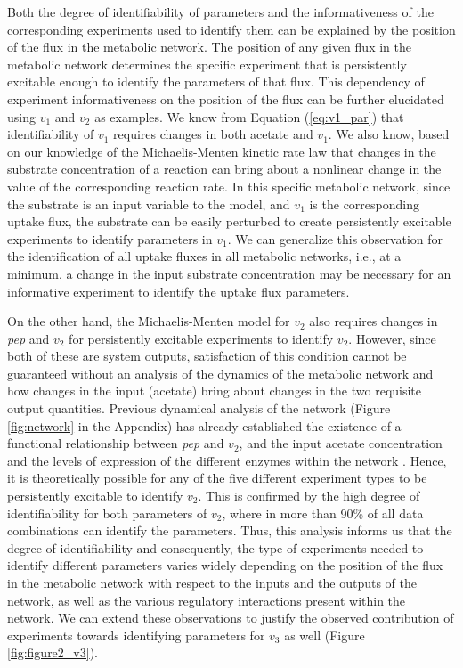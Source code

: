 \documentclass[10pt]{article}
\begin{document}
	Both the degree of identifiability of parameters and the informativeness of the corresponding experiments used to identify them can be explained by the position of the flux in the metabolic network. The position of any given flux in the metabolic network determines the specific experiment that is persistently excitable enough to identify the parameters of that flux. This dependency of experiment informativeness on the position of the flux can be further elucidated using $v_1$ and $v_2$ as examples. We know from Equation (\ref{eq:v1_par}) that identifiability of $v_1$ requires changes in both acetate and $v_1$. We also know, based on our knowledge of the Michaelis-Menten kinetic rate law that changes in the substrate concentration of a reaction can bring about a nonlinear change in the value of the corresponding reaction rate. In this specific metabolic network, since the substrate is an input variable to the model, and $v_1$ is the corresponding uptake flux, the substrate can be easily perturbed to create persistently excitable experiments to identify parameters in $v_1$. We can generalize this observation for the identification of all uptake fluxes in all metabolic networks, i.e., at a minimum, a change in the input substrate concentration may be necessary for an informative experiment to identify the uptake flux parameters. 
	
	On the other hand, the Michaelis-Menten model for $v_2$ also requires changes in \textit{pep} and $v_2$ for persistently excitable experiments to identify $v_2$. However, since both of these are system outputs, satisfaction of this condition cannot be guaranteed without an analysis of the dynamics of the metabolic network and how changes in the input (acetate) bring about changes in the two requisite output quantities. Previous dynamical analysis of the network (Figure \ref{fig:network} in the Appendix) has already established the existence of a functional relationship between \textit{pep} and $v_2$, and the input acetate concentration and the levels of expression of the different enzymes within the network \parencite{Srinivasan2017}. Hence, it is theoretically possible for any of the five different experiment types to be persistently excitable to identify $v_2$. This is confirmed by the high degree of identifiability for both parameters of $v_2$, where in more than 90\% of all data combinations can identify the parameters. Thus, this analysis informs us that the degree of identifiability and consequently, the type of experiments needed to identify different parameters varies widely depending on the position of the flux in the metabolic network with respect to the inputs and the outputs of the network, as well as the various regulatory interactions present within the network. We can extend these observations to justify the observed contribution of experiments towards identifying parameters for $v_3$ as well (Figure \ref{fig:figure2_v3}).	
	
\end{document}
